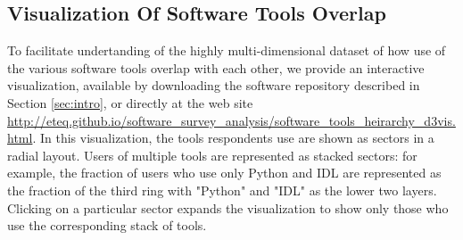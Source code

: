 \subsection{Visualization Of Software Tools Overlap}
\label{ssec:d3viz}

To facilitate undertanding of the highly multi-dimensional dataset of how use of the various software tools overlap with each other, we provide an interactive visualization, available by downloading the software repository described in Section \ref{sec:intro}, or directly at the web site \url{http://eteq.github.io/software_survey_analysis/software_tools_heirarchy_d3vis.html}. In this visualization, the tools respondents use are shown as sectors in a radial layout.  Users of multiple tools are represented as stacked sectors: for example, the fraction of users who use only Python and IDL are represented as the fraction of the third ring with "Python" and "IDL" as the lower two layers.  Clicking on a particular sector expands the visualization to show only those who use the corresponding stack of tools.